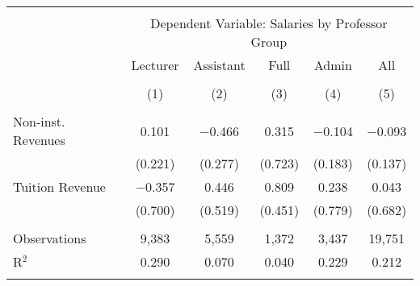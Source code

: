 
\begin{tabular}{@{\extracolsep{5pt}}lccccc} 
\\[-1.8ex]\hline 
\hline \\[-1.8ex] 
 & \multicolumn{5}{c}{Dependent Variable: Salaries by Professor Group} \\ 
\cline{2-6} 
 & Lecturer & Assistant & Full & Admin & All \\ 
\\[-1.8ex] & (1) & (2) & (3) & (4) & (5)\\ 
\hline \\[-1.8ex] 
 Non-inst. Revenues & 0.101 & $-$0.466 & 0.315 & $-$0.104 & $-$0.093 \\ 
  & (0.221) & (0.277) & (0.723) & (0.183) & (0.137) \\ 
  Tuition Revenue & $-$0.357 & 0.446 & 0.809 & 0.238 & 0.043 \\ 
  & (0.700) & (0.519) & (0.451) & (0.779) & (0.682) \\ 
 \hline \\[-1.8ex] 
Observations & 9,383 & 5,559 & 1,372 & 3,437 & 19,751 \\ 
R$^{2}$ & 0.290 & 0.070 & 0.040 & 0.229 & 0.212 \\ 
\hline 
\hline \\[-1.8ex] 
\end{tabular} 
